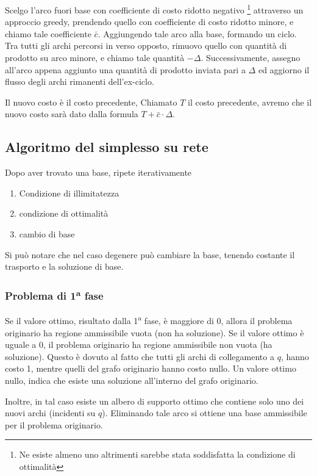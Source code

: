 \documentclass[../template]{subfiles}
\begin{document}
Scelgo l'arco fuori base con coefficiente di costo ridotto negativo \footnote{Ne esiste almeno uno altrimenti
sarebbe stata soddisfatta la condizione di ottimalità} attraverso un approccio greedy, prendendo quello con
coefficiente di costo ridotto minore, e chiamo tale coefficiente $\bar{c}$.
Aggiungendo tale arco alla base, formando un ciclo.
Tra tutti gli archi percorsi in verso opposto, rimuovo quello con quantità di prodotto su arco minore, e chiamo
tale quantità $-\Delta$. Successivamente, assegno all'arco appena aggiunto una quantità di prodotto inviata
pari a $\Delta$ ed aggiorno il flusso degli archi rimanenti dell'ex-ciclo.

Il nuovo costo è il costo precedente,
Chiamato $T$ il costo precedente, avremo che il nuovo costo sarà dato dalla formula $T + \bar{c} \cdot \Delta$.

\subsection{Algoritmo del simplesso su rete} %
Dopo aver trovato una base, ripete iterativamente
\begin{enumerate}
    \item Condizione di illimitatezza
    \item condizione di ottimalità
    \item cambio di base
\end{enumerate}
Si può notare che nel caso degenere può cambiare la base, tenendo costante il trasporto e la soluzione di base.
\subsubsection{Problema di 1\textsuperscript{a} fase}
Se il valore ottimo, risultato dalla 1\textsuperscript{a} fase, è maggiore di 0, allora il problema originario ha regione
ammissibile vuota (non ha soluzione).
Se il valore ottimo è uguale a 0, il problema originario ha regione ammissibile non vuota (ha soluzione).
Questo è dovuto al fatto che tutti gli archi di collegamento a $q$, hanno costo 1, mentre quelli del
grafo originario hanno costo nullo. Un valore ottimo nullo, indica che esiste una soluzione all'interno del
grafo originario.

Inoltre, in tal caso esiste un albero di supporto ottimo che contiene solo uno dei nuovi archi (incidenti su $q$).
Eliminando tale arco si ottiene una base ammissibile per il problema originario.

\end{document}
